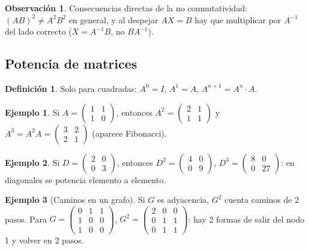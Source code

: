 \documentclass[a4paper,12pt]{article}
\theoremstyle{definition}
\newtheorem{definicion}{Definición}[section]
\newtheorem{ejemplo}{Ejemplo}[section]
\newtheorem{observacion}{Observación}[section]
\begin{document}
\begin{observacion}
Consecuencias directas de la no conmutatividad: $(AB)^2 \neq A^2B^2$ en general, y al despejar $AX=B$ hay que multiplicar por $A^{-1}$ del lado correcto ($X=A^{-1}B$, no $BA^{-1}$).
\end{observacion}

\subsection{Potencia de matrices}
\begin{definicion}
Solo para cuadradas: $A^0=I$, $A^1=A$, $A^{n+1}=A^n \cdot A$.
\end{definicion}

\begin{ejemplo}
Si $A=\begin{pmatrix} 1 & 1 \\ 1 & 0 \end{pmatrix}$, entonces $A^2 = \begin{pmatrix} 2 & 1 \\ 1 & 1 \end{pmatrix}$ y $A^3 = A^2 A = \begin{pmatrix} 3 & 2 \\ 2 & 1 \end{pmatrix}$ (aparece Fibonacci).
\end{ejemplo}

\begin{ejemplo}
Si $D=\begin{pmatrix} 2 & 0 \\ 0 & 3 \end{pmatrix}$, entonces $D^2=\begin{pmatrix} 4 & 0 \\ 0 & 9 \end{pmatrix}$, $D^3=\begin{pmatrix} 8 & 0 \\ 0 & 27 \end{pmatrix}$: en diagonales se potencia elemento a elemento.
\end{ejemplo}

\begin{ejemplo}[Caminos en un grafo]
Si $G$ es adyacencia, $G^2$ cuenta caminos de $2$ pasos. Para $G=\begin{pmatrix} 0 & 1 & 1 \\ 1 & 0 & 0 \\ 1 & 0 & 0 \end{pmatrix}$, $G^2=\begin{pmatrix} 2 & 0 & 0 \\ 0 & 1 & 1 \\ 0 & 1 & 1 \end{pmatrix}$: hay 2 formas de salir del nodo 1 y volver en 2 pasos.
\end{ejemplo}
\end{document}
